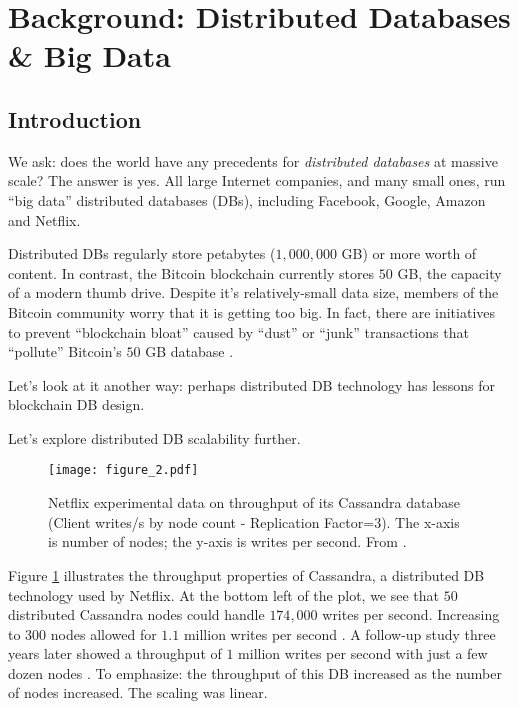 \section{Background: Distributed Databases \& Big Data}\label{sec:distributed}

\subsection{Introduction}
We ask: does the world have any precedents for \textit{distributed databases} at massive scale? The answer is yes.
All large Internet companies, and many small ones, run “big data” distributed databases (DBs), including Facebook, Google, Amazon and Netflix.

Distributed DBs regularly store petabytes ($1,000,000$ GB) or more worth of content. 
In contrast, the Bitcoin blockchain currently stores $50$ GB, the capacity of a modern thumb drive.
Despite it's relatively-small data size, members of the Bitcoin community worry that it is getting too big. In fact, there are initiatives to prevent “blockchain bloat” caused by “dust” or “junk” transactions that “pollute” Bitcoin’s $50$ GB database \cite{wagner2014blockchain_bloat}.

Let’s look at it another way: perhaps distributed DB technology has lessons for blockchain DB design.

\medskip
\centerline{Let’s explore distributed DB scalability further.}

\begin{figure}[!ht]
  \centering
  \texttt{[image: figure\_2.pdf]}
  \caption{Netflix experimental data on throughput of its Cassandra database (Client writes/s by node count - Replication Factor=$3$).
  The x-axis is number of nodes; the y-axis is writes per second. From \cite{cockcroft2011benchmarking}.}
  \label{fig:cassandra_throughput}
\end{figure}

\medskip
Figure \ref{fig:cassandra_throughput} illustrates the throughput properties of Cassandra, a distributed DB technology used by Netflix.
At the bottom left of the plot, we see that $50$ distributed Cassandra nodes could handle $174,000$ writes per second.
Increasing to $300$ nodes allowed for $1.1$ million writes per second \cite{cockcroft2011benchmarking}.
A follow-up study three years later showed a throughput of $1$ million writes per second with just a few dozen nodes \cite{kalantzis_netflix}.
To emphasize: the throughput of this DB increased as the number of nodes increased. The scaling was linear.

